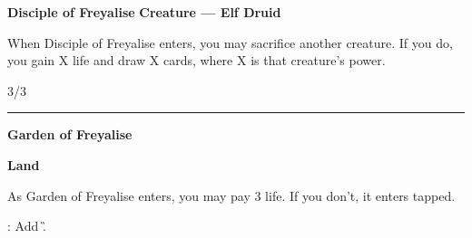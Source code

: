 \documentclass[8pt]{extarticle}
\begin{document}
{\large\textbf{Disciple of Freyalise}}
\hfill
\3\G\G\G

\textbf{Creature — Elf Druid}

When Disciple of Freyalise enters, you may sacrifice another creature. If you do, you gain X life and draw X cards, where X is that creature's power.

\hfill3/3

\vfill
\hrule
\vfill

{\large\textbf{Garden of Freyalise}}

\textbf{Land}

As Garden of Freyalise enters, you may pay 3 life. If you don't, it enters tapped.

\T: Add \G.
\end{document}
